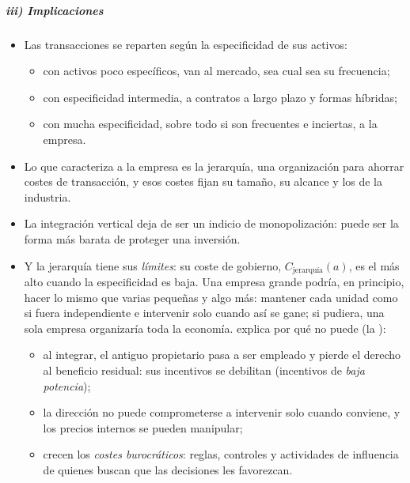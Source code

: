 \documentclass[11pt]{article}
\begin{document}
\subparagraph{iii) Implicaciones}

\begin{itemize}
\item Las transacciones se reparten según la especificidad de sus activos\nocite{Williamson1979Transaction}:
  \begin{itemize}
  \item con activos poco específicos, van al mercado, sea cual sea su frecuencia;
  \item con especificidad intermedia, a contratos a largo plazo y formas híbridas;
  \item con mucha especificidad, sobre todo si son frecuentes e inciertas, a la empresa.
  \end{itemize}
\item Lo que caracteriza a la empresa es la jerarquía, una organización para ahorrar costes de transacción, y esos costes fijan su tamaño, su alcance y los de la industria.
\item La integración vertical deja de ser un indicio de monopolización: puede ser la forma más barata de proteger una inversión.
\item Y la jerarquía tiene sus \emph{límites}: su coste de gobierno, $C_{\text{jerarquía}}(a)$, es el más alto cuando la especificidad es baja. Una empresa grande podría, en principio, hacer lo mismo que varias pequeñas y algo más: mantener cada unidad como si fuera independiente e intervenir solo cuando así se gane; si pudiera, una sola empresa organizaría toda la economía. \textcite[cap.~6]{Williamson1985Economic} explica por qué no puede (la ):
  \begin{itemize}
  \item al integrar, el antiguo propietario pasa a ser empleado y pierde el derecho al beneficio residual: sus incentivos se debilitan (incentivos de \emph{baja potencia});
  \item la dirección no puede comprometerse a intervenir solo cuando conviene, y los precios internos se pueden manipular;
  \item crecen los \emph{costes burocráticos}: reglas, controles y actividades de influencia de quienes buscan que las decisiones les favorezcan.
  \end{itemize}
\end{itemize}
\end{document}
